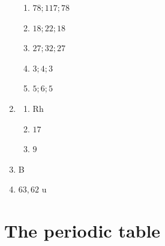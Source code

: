 \begin{multicols}{4}
\begin{enumerate}[noitemsep, label=\textbf{\arabic*}. ]
    \begin{enumerate}[noitemsep, label=\textbf{(\alph*)} ]
    \item $78 ; 117 ; 78$
    \item $18 ; 22 ; 18$
    \item $27 ; 32 ; 27$
    \item $3 ; 4 ; 3$
    \item $5 ; 6 ; 5$
    \end{enumerate}
\item %
  \begin{enumerate}[noitemsep, label=\textbf{(\alph*)} ]
  \item Rh
  \item $17$
  \item $9$
  \end{enumerate}
\item %
B
\item %
$63,62 \text{ u}$
\end{enumerate}
\end{multicols}
\section{The periodic table}

